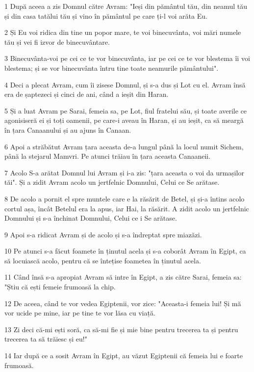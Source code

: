 \par 1 După aceea a zis Domnul către Avram: "Ieși din pământul tău, din neamul tău și din casa tatălui tău și vino în pământul pe care ți-l voi arăta Eu.
\par 2 Și Eu voi ridica din tine un popor mare, te voi binecuvânta, voi mări numele tău și vei fi izvor de binecuvântare.
\par 3 Binecuvânta-voi pe cei ce te vor binecuvânta, iar pe cei ce te vor blestema îi voi blestema; și se vor binecuvânta întru tine toate neamurile pământului".
\par 4 Deci a plecat Avram, cum îi zisese Domnul, și s-a dus și Lot cu el. Avram însă era de șaptezeci și cinci de ani, când a ieșit din Haran.
\par 5 Și a luat Avram pe Sarai, femeia sa, pe Lot, fiul fratelui său, și toate averile ce agonisiseră ei și toți oamenii, pe care-i aveau în Haran, și au ieșit, ca să meargă în țara Canaanului și au ajuns în Canaan.
\par 6 Apoi a străbătut Avram țara aceasta de-a lungul până la locul numit Sichem, până la stejarul Mamvri. Pe atunci trăiau în țara aceasta Canaaneii.
\par 7 Acolo S-a arătat Domnul lui Avram și i-a zis: "țara aceasta o voi da urmașilor tăi". Și a zidit Avram acolo un jertfelnic Domnului, Celui ce Se arătase.
\par 8 De acolo a pornit el spre muntele care e la răsărit de Betel, și și-a întins acolo cortul așa, încât Betelul era la apus, iar Hai, la răsărit. A zidit acolo un jertfelnic Domnului și s-a închinat Domnului, Celui ce i Se arătase.
\par 9 Apoi s-a ridicat Avram și de acolo și s-a îndreptat spre miazăzi.
\par 10 Pe atunci s-a făcut foamete în ținutul acela și s-a coborât Avram în Egipt, ca să locuiască acolo, pentru că se întețise foametea în ținutul acela.
\par 11 Când însă s-a apropiat Avram să intre în Egipt, a zis către Sarai, femeia sa: "Știu că ești femeie frumoasă la chip.
\par 12 De aceea, când te vor vedea Egiptenii, vor zice: "Aceasta-i femeia lui! Și mă vor ucide pe mine, iar pe tine te vor lăsa cu viață.
\par 13 Zi deci că-mi ești soră, ca să-mi fie și mie bine pentru trecerea ta și pentru trecerea ta să trăiesc și eu!"
\par 14 Iar după ce a sosit Avram în Egipt, au văzut Egiptenii că femeia lui e foarte frumoasă.
